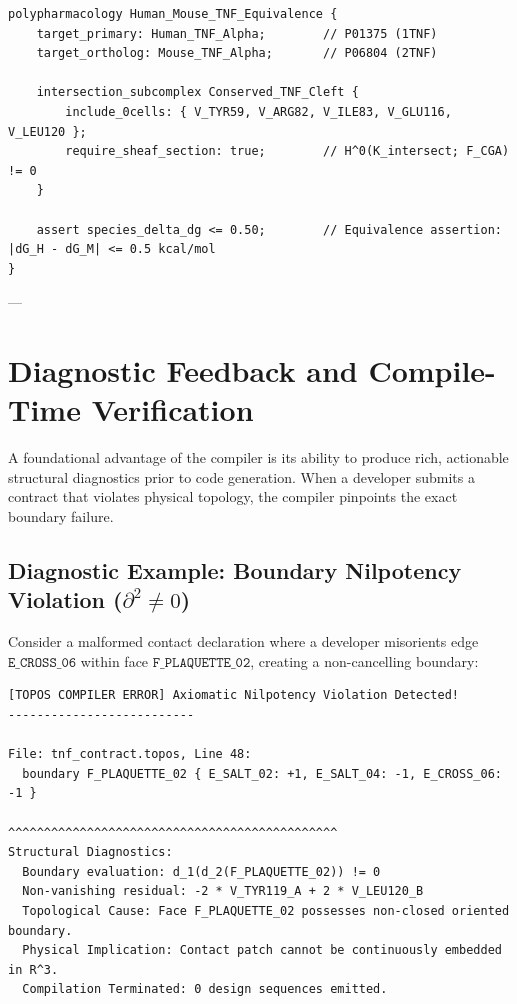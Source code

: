 \begin{lstlisting}[style=toposstyle, caption={ToposLang Cross-Species Polypharmacology Contract.}]
polypharmacology Human_Mouse_TNF_Equivalence {
    target_primary: Human_TNF_Alpha;        // P01375 (1TNF)
    target_ortholog: Mouse_TNF_Alpha;       // P06804 (2TNF)

    intersection_subcomplex Conserved_TNF_Cleft {
        include_0cells: { V_TYR59, V_ARG82, V_ILE83, V_GLU116, V_LEU120 };
        require_sheaf_section: true;        // H^0(K_intersect; F_CGA) != 0
    }

    assert species_delta_dg <= 0.50;        // Equivalence assertion: |dG_H - dG_M| <= 0.5 kcal/mol
}
\end{lstlisting}

---

\section{Diagnostic Feedback and Compile-Time Verification}
\label{sec:diagnostic_feedback}

A foundational advantage of the \ToposLang{} compiler is its ability to produce rich, actionable structural diagnostics prior to code generation. When a developer submits a contract that violates physical topology, the compiler pinpoints the exact boundary failure.

\subsection{Diagnostic Example: Boundary Nilpotency Violation (\texorpdfstring{$\partial^2 \ne 0$}{d^2 != 0})}
Consider a malformed contact declaration where a developer misorients edge $\texttt{E\_CROSS\_06}$ within face $\texttt{F\_PLAQUETTE\_02}$, creating a non-cancelling boundary:
\begin{lstlisting}[language={}]
[TOPOS COMPILER ERROR] Axiomatic Nilpotency Violation Detected!
--------------------------

File: tnf_contract.topos, Line 48:
  boundary F_PLAQUETTE_02 { E_SALT_02: +1, E_SALT_04: -1, E_CROSS_06: -1 }
                            ^^^^^^^^^^^^^^^^^^^^^^^^^^^^^^^^^^^^^^^^^^^^^^
Structural Diagnostics:
  Boundary evaluation: d_1(d_2(F_PLAQUETTE_02)) != 0
  Non-vanishing residual: -2 * V_TYR119_A + 2 * V_LEU120_B
  Topological Cause: Face F_PLAQUETTE_02 possesses non-closed oriented boundary.
  Physical Implication: Contact patch cannot be continuously embedded in R^3.
  Compilation Terminated: 0 design sequences emitted.
\end{lstlisting}

